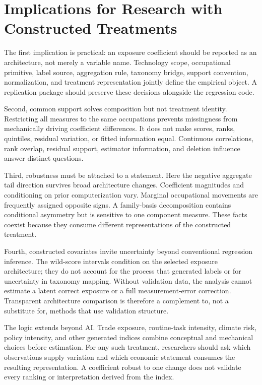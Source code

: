 \section{Implications for Research with Constructed Treatments}\label{sec:implications}

The first implication is practical: an exposure coefficient should be reported as an architecture, not merely a variable name. Technology scope, occupational primitive, label source, aggregation rule, taxonomy bridge, support convention, normalization, and treatment representation jointly define the empirical object. A replication package should preserve these decisions alongside the regression code.

Second, common support solves composition but not treatment identity. Restricting all measures to the same occupations prevents missingness from mechanically driving coefficient differences. It does not make scores, ranks, quintiles, residual variation, or fitted information equal. Continuous correlations, rank overlap, residual support, estimator information, and deletion influence answer distinct questions.

Third, robustness must be attached to a statement. Here the negative aggregate tail direction survives broad architecture changes. Coefficient magnitudes and conditioning on prior computerization vary. Marginal occupational movements are frequently assigned opposite signs. A family-basis decomposition contains conditional asymmetry but is sensitive to one component measure. These facts coexist because they consume different representations of the constructed treatment.

Fourth, constructed covariates invite uncertainty beyond conventional regression inference. The wild-score intervals condition on the selected exposure architecture; they do not account for the process that generated labels or for uncertainty in taxonomy mapping. Without validation data, the analysis cannot estimate a latent correct exposure or a full measurement-error correction. Transparent architecture comparison is therefore a complement to, not a substitute for, methods that use validation structure.

The logic extends beyond AI. Trade exposure, routine-task intensity, climate risk, policy intensity, and other generated indices combine conceptual and mechanical choices before estimation. For any such treatment, researchers should ask which observations supply variation and which economic statement consumes the resulting representation. A coefficient robust to one change does not validate every ranking or interpretation derived from the index.

